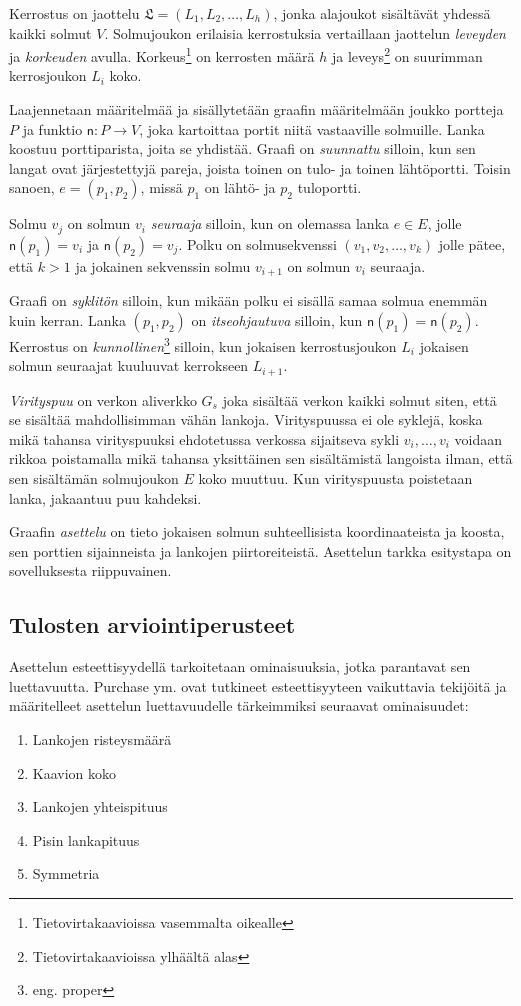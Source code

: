\documentclass[finnish,12pt]{article}
\begin{document}
Kerrostus on jaottelu $\mathfrak{L} = (L_1, L_2, \dots, L_h)$, jonka alajoukot sisältävät yhdessä kaikki solmut $V$.
Solmujoukon erilaisia kerrostuksia vertaillaan jaottelun \emph{leveyden} ja \emph{korkeuden} avulla.
Korkeus\footnote{Tietovirtakaavioissa vasemmalta oikealle} on kerrosten määrä $h$ ja leveys\footnote{Tietovirtakaavioissa ylhäältä alas} on suurimman kerrosjoukon $L_i$ koko.

Laajennetaan määritelmää ja sisällytetään graafin määritelmään joukko portteja $P$ ja funktio $\mathsf{n} : P \rightarrow V$, joka kartoittaa portit niitä vastaaville solmuille.
Lanka koostuu porttiparista, joita se yhdistää. Graafi on \emph{suunnattu} silloin, kun sen langat ovat järjestettyjä pareja, joista toinen on tulo- ja toinen lähtöportti.
Toisin sanoen, $e = (p_1, p_2)$, missä $p_1$ on lähtö- ja $p_2$ tuloportti.

Solmu $v_j$ on solmun $v_i$ \emph{seuraaja} silloin, kun on olemassa lanka $e \in E$, jolle $\mathsf{n}(p_1) = v_i$ ja $\mathsf{n}(p_2) = v_j$.
Polku on solmusekvenssi $(v_1, v_2, \dots , v_k)$ jolle pätee, että $k>1$ ja jokainen sekvenssin solmu $v_{i+1}$ on solmun $v_i$ seuraaja.

Graafi on \emph{syklitön} silloin, kun mikään polku ei sisällä samaa solmua enemmän kuin kerran.
Lanka $(p_1, p_2)$ on \emph{itseohjautuva} silloin, kun $\mathsf{n}(p_1) = \mathsf{n}(p_2)$.
Kerrostus on \emph{kunnollinen}\footnote{eng. proper} silloin, kun jokaisen kerrostusjoukon $L_i$ jokaisen solmun seuraajat kuuluuvat kerrokseen $L_{i+1}$.

\emph{Virityspuu} on verkon aliverkko $G_s$ joka sisältää verkon kaikki solmut siten, että se sisältää mahdollisimman vähän lankoja.
Virityspuussa ei ole syklejä, koska mikä tahansa virityspuuksi ehdotetussa verkossa sijaitseva sykli $v_i, ... , v_i$ voidaan rikkoa poistamalla mikä tahansa yksittäinen sen sisältämistä langoista ilman, että sen sisältämän solmujoukon $E$ koko muuttuu.
Kun virityspuusta poistetaan lanka, jakaantuu puu kahdeksi.

Graafin \emph{asettelu} on tieto jokaisen solmun suhteellisista koordinaateista ja koosta, sen porttien sijainneista ja lankojen piirtoreiteistä. 
Asettelun tarkka esitystapa on sovelluksesta riippuvainen.

 		\subsection{Tulosten arviointiperusteet}

Asettelun esteettisyydellä tarkoitetaan ominaisuuksia, jotka parantavat sen luettavuutta.
Purchase ym. \cite{RefWorks:47} ovat tutkineet esteettisyyteen vaikuttavia tekijöitä ja määritelleet asettelun luettavuudelle tärkeimmiksi seuraavat ominaisuudet: 
\begin{enumerate}
  \item Lankojen risteysmäärä
  \item Kaavion koko
  \item Lankojen yhteispituus
  \item Pisin lankapituus
  \item Symmetria
\end{enumerate}
\end{document}
